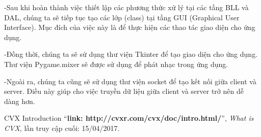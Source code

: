 \documentclass[a4paper]{article}
\begin{document}
\begin{flushleft}
	-Sau khi hoàn thành việc thiết lập các phương thức xử lý tại các tầng BLL và DAL,
	chúng ta sẽ tiếp tục tạo các lớp (class) tại tầng GUI (Graphical User Interface). Mục đích của việc này là để thực hiện các thao tác giao diện cho ứng dụng.

	-Đồng thời, chúng ta sẽ sử dụng thư viện Tkinter để tạo giao diện cho ứng dụng.
	Thư viện Pygame.mixer sẽ được sử dụng để phát nhạc trong ứng dụng.

	-Ngoài ra, chúng ta cũng sẽ sử dụng thư viện socket để tạo kết nối giữa client và server.
	Điều này giúp cho việc truyền dữ liệu giữa client và server trở nên dễ dàng hơn.
\end{flushleft}
\newpage
\begin{thebibliography}{80}

	CVX Introduction
	``\textbf{link: http://cvxr.com/cvx/doc/intro.html/}'',
	\textit{What is CVX}, lần truy cập cuối: 15/04/2017.

\end{thebibliography}
\end{document}
